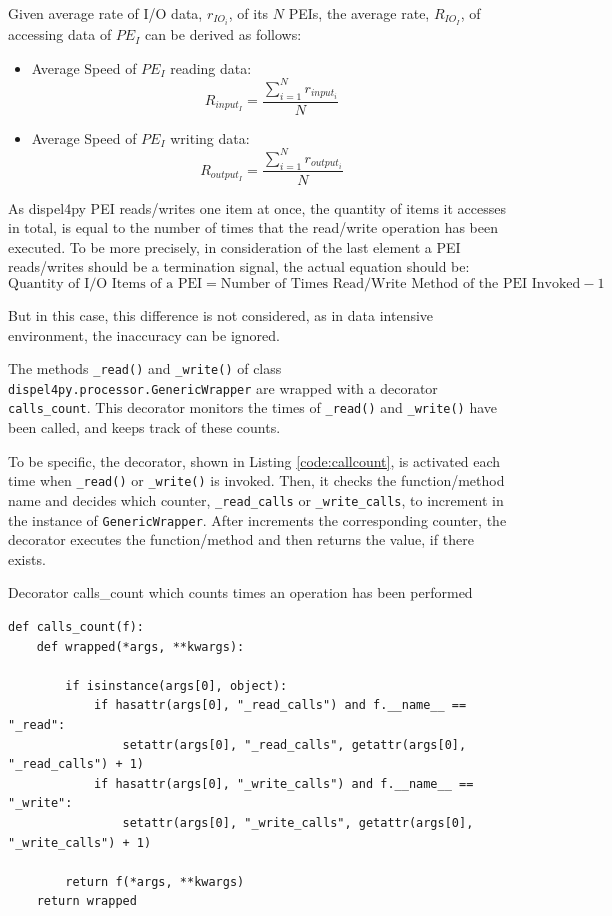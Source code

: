 \documentclass[10pt,twoside,openright,logo]{report}
\begin{document}
Given average rate of I/O data, $r_{IO_i}$, of its $N$ PEIs, the average rate, $R_{IO_I}$, of accessing data of $PE_I$ can be derived as follows:
\begin{itemize}
    \item Average Speed of $PE_I$ reading data:
        $$R_{input_I} = \frac{\sum\limits^{N}_{i=1}r_{input_i}}{N}$$
    \item Average Speed of $PE_I$ writing data:
        $$R_{output_I} = \frac{\sum\limits^{N}_{i=1}r_{output_i}}{N}$$
\end{itemize}

As dispel4py PEI reads/writes one item at once, the quantity of items it accesses in total, is equal to the number of times that the read/write operation has been executed. To be more precisely, in consideration of the last element a PEI reads/writes should be a termination signal, the actual equation should be:
$$\text{Quantity of I/O Items of a PEI} = \text{Number of Times Read/Write Method of the PEI Invoked} - 1$$

But in this case, this difference is not considered, as in data intensive environment, the inaccuracy can be ignored.

The methods \texttt{_read()} and \texttt{_write()} of class \texttt{dispel4py.processor.GenericWrapper} are wrapped with a decorator \texttt{calls_count}. This decorator monitors the times of \texttt{_read()} and \texttt{_write()} have been called, and keeps track of these counts.

To be specific, the decorator, shown in Listing \ref{code:callcount}, is activated each time when \texttt{_read()} or \texttt{_write()} is invoked. Then, it checks the function/method name and decides which counter, \texttt{_read_calls} or \texttt{_write_calls}, to increment in the instance of \texttt{GenericWrapper}. After increments the corresponding counter, the decorator executes the function/method and then returns the value, if there exists.
\begin{listing}
\caption{Decorator calls\_count which counts times an operation has been performed}
\label{code:callcount}
\begin{verbatim}
def calls_count(f):
    def wrapped(*args, **kwargs):

        if isinstance(args[0], object):
            if hasattr(args[0], "_read_calls") and f.__name__ == "_read":
                setattr(args[0], "_read_calls", getattr(args[0], "_read_calls") + 1)
            if hasattr(args[0], "_write_calls") and f.__name__ == "_write":
                setattr(args[0], "_write_calls", getattr(args[0], "_write_calls") + 1)

        return f(*args, **kwargs)
    return wrapped
\end{verbatim}
\end{listing}
\end{document}
